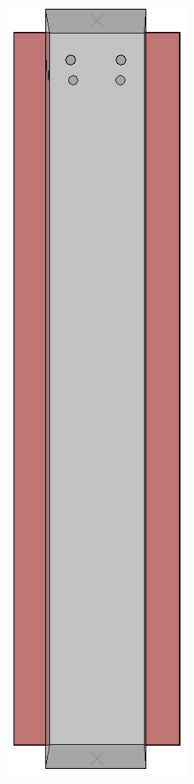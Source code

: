 \documentclass[
documentsize = a4, %
font = cmr, %
typesize = 11, %
printmode = true,
onehalfspacing = true,
language = en, %
titlepage = udciccp, %
degree = pt, %
dedication = true,
acknowledgements = true,
abstract-en = true,
abstract-es = false,
abstract-ga = false,
epigraphs = true,
toc = true,
lof = true,
lot = true,
frontmatterintoc = false,
notation = false,
minimal = false,
]{UDCthesis}
\begin{document}
\begin{figure}
	\centering
	\begin{minipage}[b]{.06\linewidth}
		\centering
		\includegraphics[width=\linewidth]{IMG_CUTRES/a0}

\end{minipage}
\end{figure}
\end{document}
